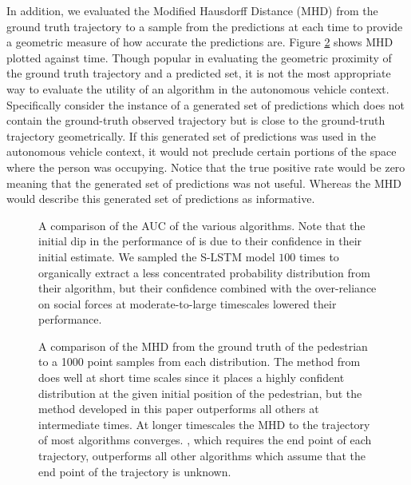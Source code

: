 \documentclass[usenames,dvipsnames]{article}
\begin{document}
\begin{enumerate}
\begin{item}
{	In addition, we evaluated the Modified Hausdorff Distance (MHD) from the ground truth trajectory to a sample from the predictions at each time to provide a geometric measure of how accurate the predictions are. 
	Figure \ref{MHD} shows MHD plotted against time.
	Though popular in evaluating the geometric proximity of the ground truth trajectory and a predicted set, it is not the most appropriate way to evaluate the utility of an algorithm in the autonomous vehicle context. 
	Specifically consider the instance of a generated set of predictions which does not contain the ground-truth observed trajectory but is close to the ground-truth trajectory geometrically. 
	If this generated set of predictions was used in the autonomous vehicle context, it would not preclude certain portions of the space where the person was occupying. 
	Notice that the true positive rate would be zero meaning that the generated set of predictions was not useful.
	Whereas the MHD would describe this generated set of predictions as informative.
}


\begin{figure}
	\centering
	\caption{A comparison of the AUC of the various algorithms. Note that the initial dip in the performance of \cite{Kitani2012} is due to their confidence in their initial estimate. We sampled the S-LSTM \cite{Alahi2016} model $100$ times to organically extract a less concentrated probability distribution from their algorithm, but their confidence combined with the over-reliance on social forces at moderate-to-large timescales lowered their performance.}
	\reversemarginpar{}
	\label{AUC}
\end{figure}

\end{item}
\begin{figure}
	\centering
	\caption{A comparison of the MHD from the ground truth of the pedestrian to a 1000 point samples from each distribution. The method from \cite{Alahi2016} does well at short time scales since it places a highly confident distribution at the given initial position of the pedestrian, but the method developed in this paper outperforms all others at intermediate times. At longer timescales the MHD to the trajectory of most algorithms converges. \cite{Kitani2012}, which requires the end point of each trajectory, outperforms all other algorithms which assume that the end point of the trajectory is unknown.}
   \reversemarginpar{}
	\label{MHD}
\end{figure}


\end{enumerate}
\end{document}
